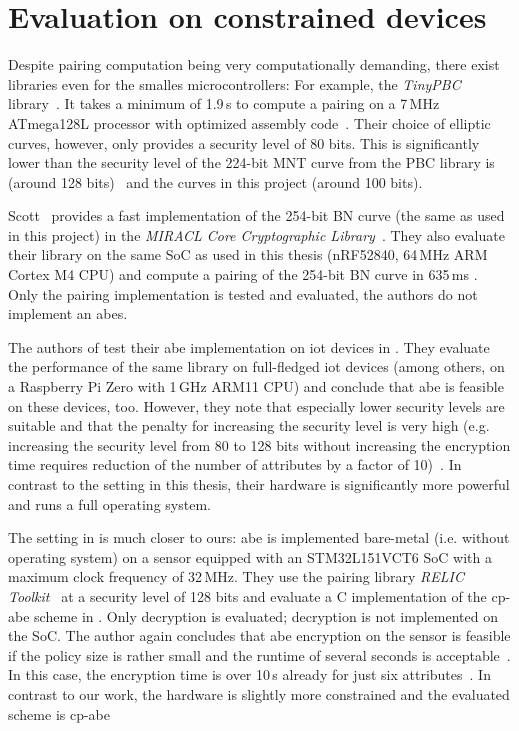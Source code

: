 \section{Evaluation on constrained devices}

Despite pairing computation being very computationally demanding, there exist libraries even for the smalles microcontrollers:
For example, the \emph{TinyPBC} library~\cite{aranha_tinypbc_nodate}.
It takes a minimum of 1.9\,s to compute a pairing on a 7\,MHz ATmega128L processor with optimized assembly code~\cite{oliveira_tinypbc_2011}. 
Their choice of elliptic curves, however, only provides a security level of 80 bits.
This is significantly lower than the security level of the 224-bit MNT curve from the PBC library is (around 128 bits)~\cite{akinyele_self-protecting_2010} and the curves in this project (around 100 bits).


Scott~\cite{scott_deployment_2020} provides a fast implementation of the 254-bit BN curve (the same as used in this project) in the \emph{MIRACL Core Cryptographic Library}~\cite{scott_miracl_nodate}.
They also evaluate their library on the same SoC as used in this thesis (nRF52840, 64\,MHz ARM Cortex M4 CPU) and compute a pairing of the 254-bit BN curve in 635\,ms \cite[Table~4]{scott_deployment_2020}.
Only the pairing implementation is tested and evaluated, the authors do not implement an \acrshort{abes}.

The authors of \cite{ambrosin_feasibility_2015} test their \acrshort{abe} implementation on \gls{iot} devices in \cite{ambrosin_feasibility_2016}.
They evaluate the performance of the same library on full-fledged \acrshort{iot} devices (among others, on a Raspberry Pi Zero with 1\,GHz ARM11 CPU) and conclude that \acrshort{abe} is feasible on these devices, too.
However, they note that especially lower security levels are suitable and that the penalty for increasing the security level is very high (e.g. increasing the security level from 80 to 128 bits without increasing the encryption time requires reduction of the number of attributes by a factor of 10)~\cite{ambrosin_feasibility_2016}.
In contrast to the setting in this thesis, their hardware is significantly more powerful and runs a full operating system.

The setting in \cite{borgh_attribute-based_2016} is much closer to ours: \acrshort{abe} is implemented bare-metal (i.e. without operating system) on a sensor equipped with an STM32L151VCT6 SoC with a maximum clock frequency of 32\,MHz.
They use the pairing library \emph{RELIC Toolkit}~\cite{aranha_relic_nodate} at a security level of 128 bits and evaluate a C implementation of the \acrshort{cp-abe} scheme in \cite{waters_ciphertext-policy_2011}.
Only decryption is evaluated; decryption is not implemented on the SoC.
The author again concludes that \acrshort{abe} encryption on the sensor is feasible if the policy size is rather small and the runtime of several seconds is acceptable~\cite{borgh_attribute-based_2016}.
In this case, the encryption time is over 10\,s already for just six attributes~\cite{borgh_attribute-based_2016}.
In contrast to our work, the hardware is slightly more constrained and the evaluated scheme is \acrshort{cp-abe}

